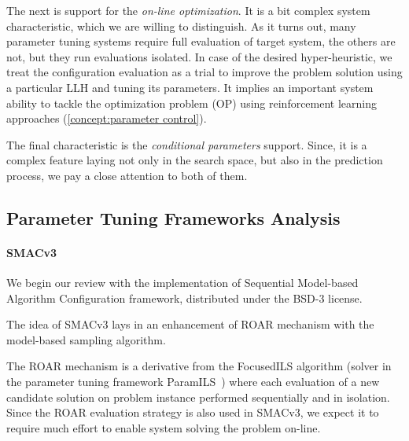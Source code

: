 The next is support for the \emph{on-line optimization}. It is a bit complex system characteristic, which we are willing to distinguish. As it turns out, many parameter tuning systems require full evaluation of target system, the others are not, but they run evaluations isolated. In case of the desired hyper-heuristic, we treat the configuration evaluation as a trial to improve the problem solution using a particular LLH and tuning its parameters. It implies an important system ability to tackle the optimization problem (OP) using reinforcement learning approaches (\cref{concept:parameter control}).

The final characteristic is the \emph{conditional parameters} support. Since, it is a complex feature laying not only in the search space, but also in the prediction process, we pay a close attention to both of them.

\subsection{Parameter Tuning Frameworks Analysis}\label{impl: Parameter Tuning Frameworks Analysis}
\paragraph{SMACv3}
We begin our review with the implementation of Sequential Model-based Algorithm Configuration framework, distributed under the BSD-3 license.

The idea of SMACv3 lays in an enhancement of ROAR mechanism with the model-based sampling algorithm.

The ROAR mechanism is a derivative from the FocusedILS algorithm (solver in the parameter tuning framework ParamILS~\cite{hutter2009paramils}) where each evaluation of a new candidate solution on problem instance performed sequentially and in isolation. Since the ROAR evaluation strategy is also used in SMACv3, we expect it to require much effort to enable system solving the problem on-line.

